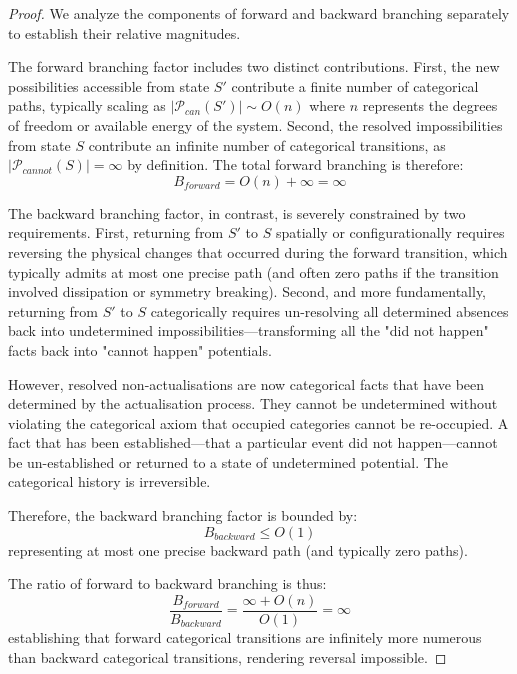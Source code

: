 \documentclass[12pt,a4paper]{article}
\theoremstyle{definition}
\theoremstyle{remark}
\begin{document}
\begin{proof}
We analyze the components of forward and backward branching separately to establish their relative magnitudes.

The forward branching factor includes two distinct contributions. First, the new possibilities accessible from state $S'$ contribute a finite number of categorical paths, typically scaling as $|\mathcal{P}_{can}(S')| \sim O(n)$ where $n$ represents the degrees of freedom or available energy of the system. Second, the resolved impossibilities from state $S$ contribute an infinite number of categorical transitions, as $|\mathcal{P}_{cannot}(S)| = \infty$ by definition. The total forward branching is therefore:
\begin{equation}
B_{forward} = O(n) + \infty = \infty
\end{equation}

The backward branching factor, in contrast, is severely constrained by two requirements. First, returning from $S'$ to $S$ spatially or configurationally requires reversing the physical changes that occurred during the forward transition, which typically admits at most one precise path (and often zero paths if the transition involved dissipation or symmetry breaking). Second, and more fundamentally, returning from $S'$ to $S$ categorically requires un-resolving all determined absences back into undetermined impossibilities—transforming all the "did not happen" facts back into "cannot happen" potentials.

However, resolved non-actualisations are now categorical facts that have been determined by the actualisation process. They cannot be undetermined without violating the categorical axiom that occupied categories cannot be re-occupied. A fact that has been established—that a particular event did not happen—cannot be un-established or returned to a state of undetermined potential. The categorical history is irreversible.

Therefore, the backward branching factor is bounded by:
\begin{equation}
B_{backward} \leq O(1)
\end{equation}
representing at most one precise backward path (and typically zero paths).

The ratio of forward to backward branching is thus:
\begin{equation}
\frac{B_{forward}}{B_{backward}} = \frac{\infty + O(n)}{O(1)} = \infty
\end{equation}
establishing that forward categorical transitions are infinitely more numerous than backward categorical transitions, rendering reversal impossible.
\end{proof}
\end{document}
